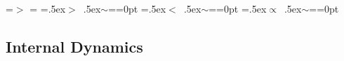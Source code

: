 \newbox\grsign \setbox\grsign=\hbox{$>$} \newdimen\grdimen \grdimen=\ht\grsign
\newbox\simlessbox \newbox\simgreatbox \newbox\simpropbox
\setbox\simgreatbox=\hbox{\raise.5ex\hbox{$>$}\llap
     {\lower.5ex\hbox{$\sim$}}}=\grdimen{}=0pt
\setbox\simlessbox=\hbox{\raise.5ex\hbox{$<$}\llap
     {\lower.5ex\hbox{$\sim$}}}=\grdimen{}=0pt
\setbox\simpropbox=\hbox{\raise.5ex\hbox{$\propto$}\llap
     {\lower.5ex\hbox{$\sim$}}}=\grdimen{}=0pt
\def\simgt{\mathrel{\copy\simgreatbox}}
\def\simlt{\mathrel{\copy\simlessbox}}
\def\simprop{\mathrel{\copy\simpropbox}}

%








%



\subsection{Internal Dynamics}

